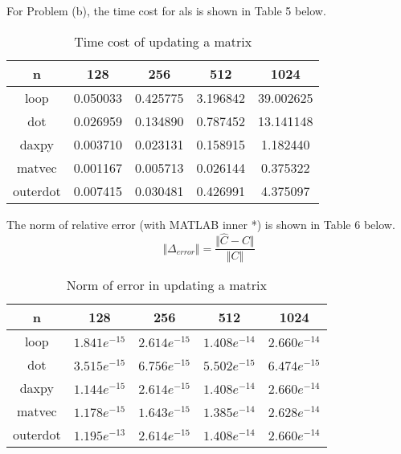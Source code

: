 {For Problem (b), the time cost for als is shown in Table 5 below.
\begin{table}[htbp] \large \centering
\begin{tabular}{|c|c|c|c|c|}
\hline
n & 128 & 256 & 512 & 1024 \\
\hline
loop & 0.050033 & 0.425775 & 3.196842 & 39.002625 \\
\hline
dot & 0.026959 & 0.134890 & 0.787452 & 13.141148 \\
\hline
daxpy & 0.003710 & 0.023131 & 0.158915 & 1.182440 \\
\hline
matvec & 0.001167 & 0.005713 & 0.026144 & 0.375322 \\
\hline
outerdot & 0.007415 & 0.030481 & 0.426991 & 4.375097 \\
\hline
\end{tabular}
\caption{Time cost of updating a matrix}
\end{table}

The norm of relative error (with MATLAB inner *) is shown in Table 6 below.
$$\Vert\Delta_{error}\Vert = \frac{\Vert\hat{C} - C\Vert}{\Vert C\Vert}$$
\begin{table}[htbp] \large \centering
\begin{tabular}{|c|c|c|c|c|}
\hline
n & 128 & 256 & 512 & 1024 \\
\hline
loop & $1.841e^{-15}$ & $2.614e^{-15}$ & $1.408e^{-14}$ & $2.660e^{-14}$ \\
\hline
dot & $3.515e^{-15}$ & $6.756e^{-15}$ & $5.502e^{-15}$ & $6.474e^{-15}$ \\
\hline
daxpy & $1.144e^{-15}$ & $2.614e^{-15}$ & $1.408e^{-14}$ & $2.660e^{-14}$ \\
\hline
matvec & $1.178e^{-15}$ & $1.643e^{-15}$ & $1.385e^{-14}$ & $2.628e^{-14}$ \\
\hline
outerdot & $1.195e^{-13}$ & $2.614e^{-15}$ & $1.408e^{-14}$ & $2.660e^{-14}$ \\
\hline
\end{tabular}
\caption{Norm of error in updating a matrix}
\end{table}
}
